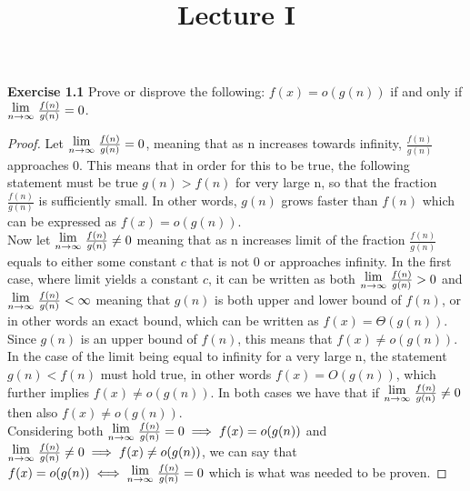 \documentclass[a4paper]{article}
\title{\vspace{-2cm}Lecture I\vspace{-2cm}}
\date{}
\newcommand{\Lim}[1]{\raisebox{0.5ex}{{$\displaystyle \lim_{#1}\;$}}}
\begin{document}
\maketitle
\noindent \textbf{Exercise 1.1} Prove or disprove the following: $f(x) = o(g(n))$ if and only if $\Lim{n \to \infty} \frac{f(n)}{g(n)}=0$.
\begin{proof}
  Let $\Lim{n \to \infty} \frac{f(n)}{g(n)}=0$, meaning that as n increases towards infinity, $\frac{f(n)}{g(n)}$ approaches 0. This means that in order for this to be true, the following statement must be true $g(n) > f(n)$ for very large n, so that the fraction $\frac{f(n)}{g(n)}$ is sufficiently small. In other words, $g(n)$ grows faster than $f(n)$ which can be expressed as $f(x) = o(g(n))$. \\
  
  Now let $\Lim{n \to \infty} \frac{f(n)}{g(n)}\neq0$ meaning that as n increases limit of the fraction $\frac{f(n)}{g(n)}$ equals to either some constant $c$ that is not 0 or approaches infinity. In the first case, where limit yields a constant $c$, it can be written as both $\Lim{n \to \infty} \frac{f(n)}{g(n)}>0$ and $\Lim{n \to \infty} \frac{f(n)}{g(n)}<\infty$ meaning that $g(n)$ is both upper and lower bound of $f(n)$, or in other words an exact bound, which can be written as $f(x) = \Theta(g(n))$. Since $g(n)$ is an upper bound of $f(n)$, this means that $f(x) \neq o(g(n))$. In the case of the limit being equal to infinity for a very large n, the statement $g(n) < f(n)$ must hold true, in other words $f(x) = O(g(n))$, which further implies $f(x) \neq o(g(n))$. In both cases we have that if $\Lim{n \to \infty} \frac{f(n)}{g(n)}\neq0$ then also $f(x) \neq o(g(n))$. \\
  
  Considering both $\Lim{n \to \infty} \frac{f(n)}{g(n)}=0 \implies f(x) = o(g(n))$ and $\Lim{n \to \infty} \frac{f(n)}{g(n)}\neq0 \implies f(x) \neq o(g(n))$, we can say that $f(x) = o(g(n)) \iff \Lim{n \to \infty} \frac{f(n)}{g(n)}=0$ which is what was needed to be proven.

\end{proof}
\end{document}
